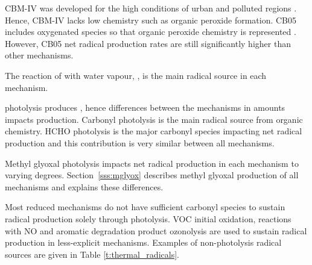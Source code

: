 CBM-IV was developed for the high  conditions of urban and polluted regions \citep{Gery:1989}.
Hence, CBM-IV lacks low  chemistry such as organic peroxide formation.
CB05 includes oxygenated species so that organic peroxide chemistry is represented \citep{Yarwood:2005}.
However, CB05 net radical production rates are still significantly higher than other mechanisms.

The reaction of  with water vapour, , is the main radical source in each mechanism.%
\begin{reactionlist}%
\end{reactionlist}%
 photolysis produces , hence differences between the mechanisms in  amounts impacts  production.
Carbonyl photolysis is the main radical source from organic chemistry.
HCHO photolysis is the major carbonyl species impacting net radical production and this contribution is very similar between all mechanisms.

Methyl glyoxal photolysis impacts net radical production in each mechanism to varying degrees.
\mbox{Section \ref{sss:mglyox}} describes methyl glyoxal production of all mechanisms and explains these differences.

Most reduced mechanisms do not have sufficient carbonyl species to sustain radical production solely through photolysis.
VOC initial oxidation,  reactions with NO and aromatic degradation product ozonolysis are used to sustain radical production in less-explicit mechanisms.
Examples of non-photolysis radical sources are given in Table \ref{t:thermal_radicals}.%

